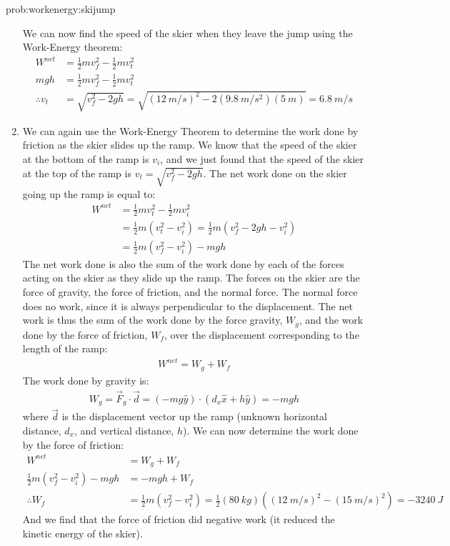 \begin{solution}{prob:workenergy:skijump}
\begin{enumerate}[label=\alph*)]
We can now find the speed of the skier when they leave the jump using the Work-Energy theorem:
\begin{align*}
W^{net}&=\frac{1}{2}mv_f^2-\frac{1}{2}mv_t^2\\
mgh &= \frac{1}{2}mv_f^2-\frac{1}{2}mv_t^2\\
\therefore v_t&=\sqrt{v_f^2-2gh}=\sqrt{(\SI{12}{m/s})^2 - 2(\SI{9.8}{m/s^2})(\SI{5}{m})}=\SI{6.8}{m/s}
\end{align*}

\item We can again use the Work-Energy Theorem to determine the work done by friction as the skier slides up the ramp. We know that the speed of the skier at the bottom of the ramp is $v_i$, and we just found that the speed of the skier at the top of the ramp is $v_t=\sqrt{v_f^2-2gh}$. The net work done on the skier going up the ramp is equal to:
\begin{align*}
W^{net}&=\frac{1}{2}mv_t^2-\frac{1}{2}mv_i^2\\
&=\frac{1}{2}m(v_t^2-v_i^2) = \frac{1}{2}m(v_f^2-2gh -v_i^2)\\
&=\frac{1}{2}m(v_f^2-v_i^2)-mgh
\end{align*}
The net work done is also the sum of the work done by each of the forces acting on the skier as they slide up the ramp. The forces on the skier are the force of gravity, the force of friction, and the normal force. The normal force does no work, since it is always perpendicular to the displacement. The net work is thus the sum of the work done by the force gravity, $W_g$, and the work done by the force of friction, $W_f$, over the displacement corresponding to the length of the ramp: 
\begin{align*}
W^{net}=W_g+W_f
\end{align*}
The work done by gravity is:
\begin{align*}
W_g = \vec F_g \cdot \vec d = (-mg\hat y) \cdot  (d_x\hat x + h \hat y) = -mgh
\end{align*}
where $\vec d$ is the displacement vector up the ramp (unknown horizontal distance, $d_x$, and vertical distance, $h$). We can now determine the work done by the force of friction:
\begin{align*}
W^{net}&=W_g+W_f\\
\frac{1}{2}m(v_f^2-v_i^2)-mgh &=  -mgh + W_f\\
\therefore W_f &= \frac{1}{2}m(v_f^2-v_i^2) = \frac{1}{2}(\SI{80}{kg})((\SI{12}{m/s})^2-(\SI{15}{m/s})^2)=\SI{-3240}{J}
\end{align*}
And we find that the force of friction did negative work (it reduced the kinetic energy of the skier).


\end{enumerate}
\end{solution}
